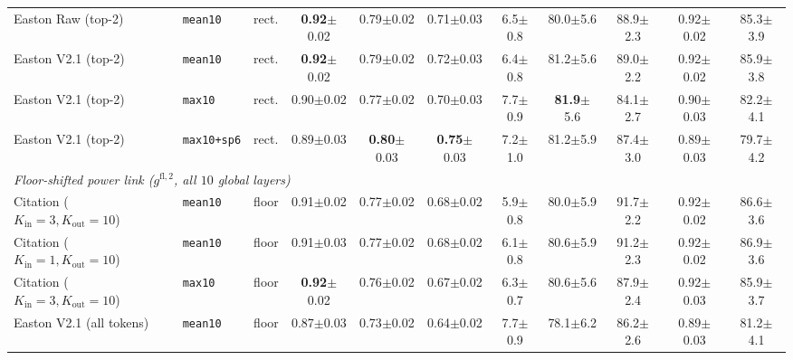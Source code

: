 \begin{table}[t]
{\begin{tabular}{lllcccccccc}
Easton Raw (top-2) & \texttt{mean10} & rect. & \textbf{0.92}{\scriptsize$\pm$0.02} & 0.79{\scriptsize$\pm$0.02} & 0.71{\scriptsize$\pm$0.03} & 6.5{\scriptsize$\pm$0.8} & 80.0{\scriptsize$\pm$5.6} & 88.9{\scriptsize$\pm$2.3} & 0.92{\scriptsize$\pm$0.02} & 85.3{\scriptsize$\pm$3.9} \\
Easton V2.1 (top-2) & \texttt{mean10} & rect. & \textbf{0.92}{\scriptsize$\pm$0.02} & 0.79{\scriptsize$\pm$0.02} & 0.72{\scriptsize$\pm$0.03} & 6.4{\scriptsize$\pm$0.8} & 81.2{\scriptsize$\pm$5.6} & 89.0{\scriptsize$\pm$2.2} & 0.92{\scriptsize$\pm$0.02} & 85.9{\scriptsize$\pm$3.8} \\
Easton V2.1 (top-2) & \texttt{max10} & rect. & 0.90{\scriptsize$\pm$0.02} & 0.77{\scriptsize$\pm$0.02} & 0.70{\scriptsize$\pm$0.03} & 7.7{\scriptsize$\pm$0.9} & \textbf{81.9}{\scriptsize$\pm$5.6} & 84.1{\scriptsize$\pm$2.7} & 0.90{\scriptsize$\pm$0.03} & 82.2{\scriptsize$\pm$4.1} \\
Easton V2.1 (top-2) & \texttt{max10+sp6} & rect. & 0.89{\scriptsize$\pm$0.03} & \textbf{0.80}{\scriptsize$\pm$0.03} & \textbf{0.75}{\scriptsize$\pm$0.03} & 7.2{\scriptsize$\pm$1.0} & 81.2{\scriptsize$\pm$5.9} & 87.4{\scriptsize$\pm$3.0} & 0.89{\scriptsize$\pm$0.03} & 79.7{\scriptsize$\pm$4.2} \\
\midrule
\multicolumn{11}{l}{\emph{Floor-shifted power link ($g^{\mathrm{fl},2}$, all $10$ global layers)}} \\
Citation ($K_{\mathrm{in}}{=}3, K_{\mathrm{out}}{=}10$) & \texttt{mean10} & floor & 0.91{\scriptsize$\pm$0.02} & 0.77{\scriptsize$\pm$0.02} & 0.68{\scriptsize$\pm$0.02} & 5.9{\scriptsize$\pm$0.8} & 80.0{\scriptsize$\pm$5.9} & 91.7{\scriptsize$\pm$2.2} & 0.92{\scriptsize$\pm$0.02} & 86.6{\scriptsize$\pm$3.6} \\
Citation ($K_{\mathrm{in}}{=}1, K_{\mathrm{out}}{=}10$) & \texttt{mean10} & floor & 0.91{\scriptsize$\pm$0.03} & 0.77{\scriptsize$\pm$0.02} & 0.68{\scriptsize$\pm$0.02} & 6.1{\scriptsize$\pm$0.8} & 80.6{\scriptsize$\pm$5.9} & 91.2{\scriptsize$\pm$2.3} & 0.92{\scriptsize$\pm$0.02} & 86.9{\scriptsize$\pm$3.6} \\
Citation ($K_{\mathrm{in}}{=}3, K_{\mathrm{out}}{=}10$) & \texttt{max10} & floor & \textbf{0.92}{\scriptsize$\pm$0.02} & 0.76{\scriptsize$\pm$0.02} & 0.67{\scriptsize$\pm$0.02} & 6.3{\scriptsize$\pm$0.7} & 80.6{\scriptsize$\pm$5.6} & 87.9{\scriptsize$\pm$2.4} & 0.92{\scriptsize$\pm$0.03} & 85.9{\scriptsize$\pm$3.7} \\
Easton V2.1 (all tokens) & \texttt{mean10} & floor & 0.87{\scriptsize$\pm$0.03} & 0.73{\scriptsize$\pm$0.02} & 0.64{\scriptsize$\pm$0.02} & 7.7{\scriptsize$\pm$0.9} & 78.1{\scriptsize$\pm$6.2} & 86.2{\scriptsize$\pm$2.6} & 0.89{\scriptsize$\pm$0.03} & 81.2{\scriptsize$\pm$4.1} \\

\end{tabular}}
\end{table}
